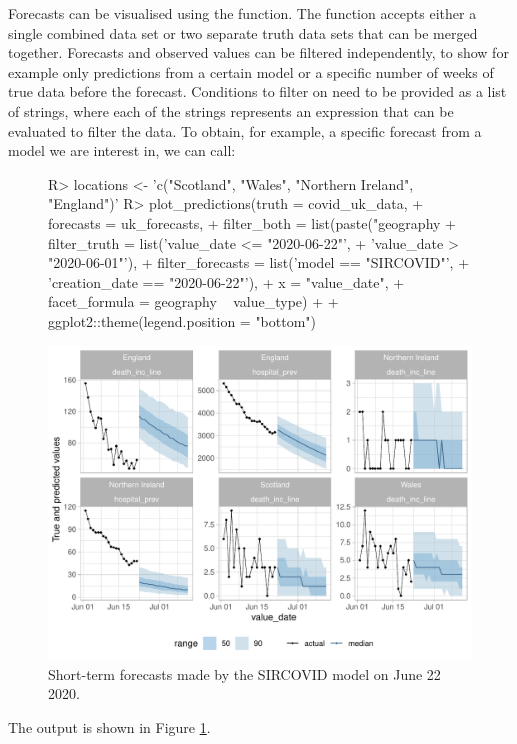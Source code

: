 \documentclass[article]{jss}
\newcommand{\fct}[1]{\code{#1()}}
\begin{document}
Forecasts can be visualised using the \fct{plot\_predictions} function. The function accepts either a single combined data set or two separate truth data sets that can be merged together. Forecasts and observed values can be filtered independently, to show for example only predictions from a certain model or a specific number of weeks of true data before the forecast. Conditions to filter on need to be provided as a list of strings, where each of the strings represents an expression that can be evaluated to filter the data. To obtain, for example, a specific forecast from a model we are interest in, we can call: 
% 
\begin{figure}[h!]
\centering
\begin{Schunk}
\begin{Sinput}
R> locations <- 'c("Scotland", "Wales", "Northern Ireland", "England")'
R> plot_predictions(truth = covid_uk_data,
+                   forecasts = uk_forecasts,
+                   filter_both = list(paste("geography %
+                   filter_truth = list('value_date <= "2020-06-22"',
+                                       'value_date > "2020-06-01"'), 
+                   filter_forecasts = list('model == "SIRCOVID"', 
+                                           'creation_date == "2020-06-22"'),
+                   x = "value_date",
+                   facet_formula = geography ~ value_type) + 
+    ggplot2::theme(legend.position = "bottom")
\end{Sinput}
\end{Schunk}
\includegraphics{plots/plot-show-forecasts}
\caption{\label{fig:forecast-visualisation} Short-term forecasts made by the SIRCOVID model on June 22 2020.}
\end{figure}
% 
The output is shown in Figure \ref{fig:forecast-visualisation}.
\end{document}
